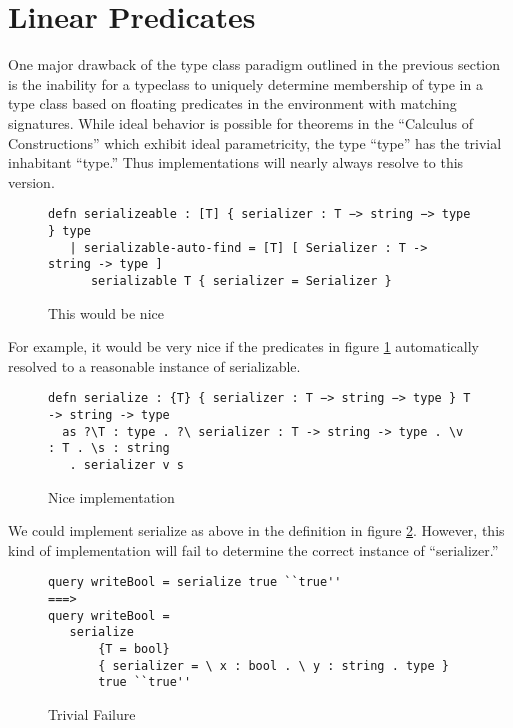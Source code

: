 \section{Linear Predicates}

One major drawback of the type class paradigm outlined in the previous section is the
inability for a typeclass to uniquely determine membership of type in a type class based
on floating predicates in the environment with matching signatures. While ideal behavior
is possible for theorems in the ``Calculus of Constructions'' which exhibit ideal parametricity,
the type “type” has the trivial inhabitant “type.”  Thus implementations
will nearly always resolve to this version.

\begin{figure}[H]
\begin{lstlisting}
defn serializeable : [T] { serializer : T −> string −> type } type
   | serializable-auto-find = [T] [ Serializer : T -> string -> type ]
      serializable T { serializer = Serializer }
\end{lstlisting}
\caption{This would be nice}
\label{lin:nice}
\end{figure}

For example, it would be very nice if the predicates in figure \ref{lin:nice} automatically
resolved to a reasonable instance of serializable.

\begin{figure}[H]
\begin{lstlisting}
defn serialize : {T} { serializer : T −> string −> type } T -> string -> type
  as ?\T : type . ?\ serializer : T -> string -> type . \v : T . \s : string 
   . serializer v s
\end{lstlisting}
\caption{Nice implementation}
\label{lin:imp}
\end{figure}

We could implement serialize as above in the definition in figure \ref{lin:imp}.
However, this kind of implementation will fail to determine the correct instance of ``serializer.''


\begin{figure}[H]
\begin{lstlisting}
query writeBool = serialize true ``true''
===>
query writeBool = 
   serialize 
       {T = bool}
       { serializer = \ x : bool . \ y : string . type } 
       true ``true''
\end{lstlisting}
\caption{Trivial Failure}
\label{lin:fail}
\end{figure}

